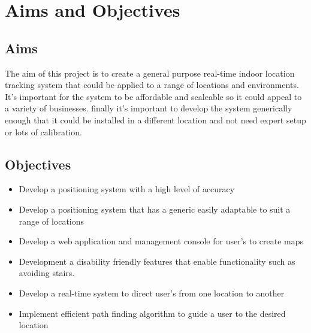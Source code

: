 \section{Aims and Objectives}\label{aimssandobj}
\subsection{Aims}
The aim of this project is to create a general purpose real-time indoor location tracking system that could be applied to a range of locations and environments. It's important for the system  to be affordable and scaleable so it could appeal to a variety of businesses. finally it's important to develop the system generically enough that it could be installed in a different location and not need expert setup or lots of calibration.

\subsection{Objectives}
\begin{itemize}
	\item Develop a positioning system with a high level of accuracy
	\item Develop a positioning system that has a generic easily adaptable to suit a range of locations
	\item Develop a web application and management console for user’s to create maps
	\item Development a disability friendly features that enable functionality such as avoiding stairs.
	\item Develop a real-time system to direct user's from one location to another
	\item Implement efficient path finding algorithm to guide a user to the desired location
\end{itemize}
\newpage
